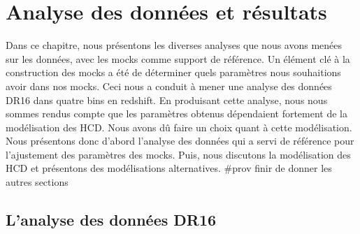 \documentclass[11pt, twoside, a4paper, openright]{report}
\begin{document}

\graphicspath{ {../figures/data_ana/} }

\chapter{Analyse des données et résultats}
\label{chap:data_ana}
\minitoc
\newpage
\thispagestyle{fancy}

Dans ce chapitre, nous présentons les diverses analyses que nous avons menées sur les données, avec les mocks comme support de référence.
Un élément clé à la construction des mocks a été de déterminer quels paramètres \lya{} nous souhaitions avoir dans nos mocks.
Ceci nous a conduit à mener une analyse des données DR16 dans quatre bins en redshift.
En produisant cette analyse, nous nous sommes rendus compte que les paramètres \lya{} obtenus dépendaient fortement de la modélisation des HCD. Nous avons dû faire un choix quant à cette modélisation.
Nous présentons donc d'abord l'analyse des données qui a servi de référence pour l'ajustement des paramètres des mocks. Puis, nous discutons la modélisation des HCD et présentons des modélisations alternatives.
\#prov finir de donner les autres sections



\section{L'analyse des données DR16}
\end{document}
